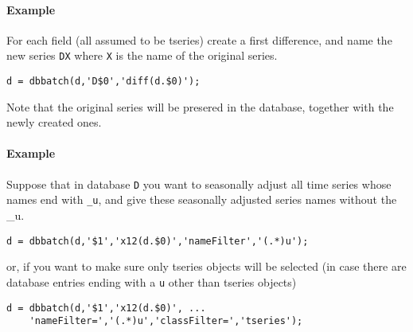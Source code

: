 \paragraph{Example}\label{example}

For each field (all assumed to be tseries) create a first difference,
and name the new series \texttt{DX} where \texttt{X} is the name of the
original series.

\begin{verbatim}
d = dbbatch(d,'D$0','diff(d.$0)');
\end{verbatim}

Note that the original series will be presered in the database, together
with the newly created ones.

\paragraph{Example}\label{example-1}

Suppose that in database \texttt{D} you want to seasonally adjust all
time series whose names end with \texttt{\_u}, and give these seasonally
adjusted series names without the \_u.

\begin{verbatim}
d = dbbatch(d,'$1','x12(d.$0)','nameFilter','(.*)u');
\end{verbatim}

or, if you want to make sure only tseries objects will be selected (in
case there are database entries ending with a \texttt{u} other than
tseries objects)

\begin{verbatim}
d = dbbatch(d,'$1','x12(d.$0)', ...
    'nameFilter=','(.*)u','classFilter=','tseries');
\end{verbatim}


